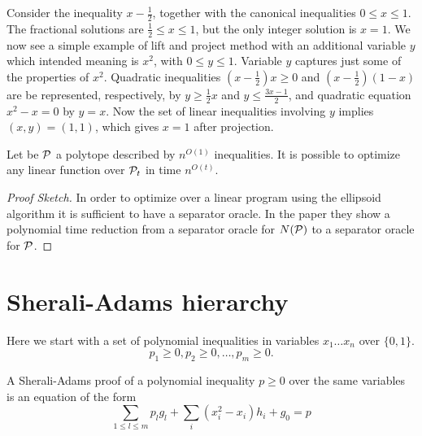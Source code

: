 \documentclass[a4paper,twoside,justified]{tufte-handout}
\begin{document}
\begin{example}
  Consider the inequality $ x-\frac{1}{2} $, together with the
  canonical inequalities $ 0\leq x \leq 1 $. The fractional solutions
  are $ \frac{1}{2} \leq x \leq 1 $, but the only integer solution is
  $ x=1 $. We now see a simple example of lift and project method with
  an additional variable $ y $ which intended meaning is $ x^{2} $,
  with $0\leq y \leq 1$. Variable $ y $ captures just some of the
  properties of $ x^{2} $. Quadratic inequalities $ (x-\frac{1}{2})x
  \geq 0 $ and $ (x-\frac{1}{2})(1-x) $ are be represented,
  respectively, by $ y \geq \frac{1}{2}x $ and $ y \leq \frac{3x-1}{2}
  $, and quadratic equation $ x^{2}-x=0 $ by $ y=x $.
  Now the set of linear inequalities involving $ y$ implies
  $(x,y)=(1,1)$, which gives $ x=1 $ after projection.
  
\end{example}

\begin{theorem}\cite{lovasz1991cones}
  Let be $\mathcal{P}$ a polytope described by $ n^{O(1)} $
  inequalities. It is possible to optimize any linear function over $
  \mathcal{P}_{t} $ in time $ n^{O(t)} $.
\end{theorem}
\begin{proof}[Proof Sketch]
  In order to optimize over a linear program using the ellipsoid
  algorithm it is sufficient to have a separator oracle. In the
  paper they show a polynomial time reduction from a separator
  oracle for $ N(\mathcal{P}) $ to a separator oracle for $\mathcal{P}$.
\end{proof}

\section{Sherali-Adams hierarchy}

Here we start with a set of polynomial inequalities in variables $
x_{1}\ldots x_{n} $ over $ \{0,1\} $.
\begin{equation}
  p_{1}\geq 0 , p_{2}\geq 0, \ldots , p_{m} \geq 0. 
\end{equation}

A Sherali-Adams proof of a polynomial inequality $p\geq 0$ over the
same variables is an equation of the form
\begin{equation}
 \label{eq:sa_inference}
 \sum_{1\leq l\leq m} p_{l} g_{l} + \sum_{i} (x^{2}_{i} -x_{i}) h_{i}
 + g_{0}= p
\end{equation}
\end{document}
